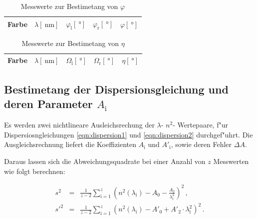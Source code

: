 		\begin{table}[h!]
			\begin{center}
				\caption{Messwerte zur Bestimetang von $\varphi$ \label{table:phi}}
				\begin{tabular}{|c|c|c|c|c|}
					\hline
						Farbe & $\lambda [\SI{}{\nano \meter}]$ & $\varphi_\mathrm{l} [\SI{}{\degree}]$ & $\varphi_\mathrm{r} [\SI{}{\degree}]$ & $\varphi [\SI{}{\degree}]$ \\
					\hline 
					\hline
						
					\hline 
				\end{tabular}
			\end{center}
		\end{table}		

		\begin{table}[h!]
			\begin{center}
				\caption{Messwerte zur Bestimetang von $\eta$ \label{table:eta}}
				\begin{tabular}{|c|c|c|c|c|}
					\hline
						Farbe & $\lambda [\SI{}{\nano \meter}]$ & $\Omega_\mathrm{l} [\SI{}{\degree}]$ & $\Omega_\mathrm{r} [\SI{}{\degree}]$ & $\eta [\SI{}{\degree}]$ \\
					\hline 
					\hline
						
					\hline 
				\end{tabular}
			\end{center}
		\end{table}		

	\clearpage

	\subsection{Bestimetang der Dispersionsgleichung und deren Parameter $A_\mathrm{i}$}
	\label{subsec:dispersionskurve}
		Es werden zwei nichtlineare Ausleichsrechung der $\lambda$- $n^2$- Wertepaare, f"ur Dispersiosngleichungen \eqref{eqn:dispersion1} und \eqref{eqn:dispersion2} durchgef"uhrt.
		Die Ausgleichsrechnung liefert die Koeffizienten $A_\mathrm{i}$ und $A'_\mathrm{i}$, sowie deren Fehler $\Delta A$.

		Daraus lassen sich die Abweichungsquadrate bei einer Anzahl von $z$ Messwerten wie folgt berechnen:

		\begin{eqnarray*}
			s^2 & = & \frac{1}{z - 2} \sum_{\mathrm{i} = 1}^z{\left(n^2(\lambda_\mathrm{i}) - A_0 - \frac{A_2}{\lambda_\mathrm{i}^2}\right)^2} \,, \\
			s'^2 & = & \frac{1}{z - 2} \sum_{\mathrm{i} = 1}^z{\left(n^2(\lambda_\mathrm{i}) - A'_0 + A'_2 \cdot \lambda_\mathrm{i}^2 \right)^2} \,. \\
		\end{eqnarray*}

